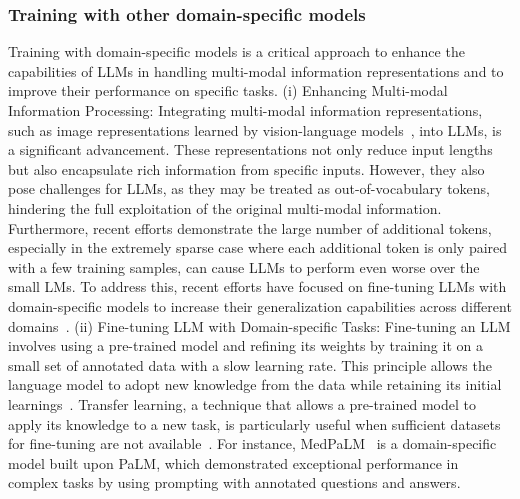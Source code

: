 \documentclass[lettersize,journal]{IEEEtran}
\begin{document}
\subsubsection{Training with other domain-specific models}
Training with domain-specific models is a critical approach to enhance the capabilities of LLMs in handling multi-modal information representations and to improve their performance on specific tasks.
(i) Enhancing Multi-modal Information Processing: 
Integrating multi-modal information representations, such as image representations learned by vision-language models~\cite{geng2022improving}, into LLMs, is a significant advancement. These representations not only reduce input lengths but also encapsulate rich information from specific inputs. 
However, they also pose challenges for LLMs, as they may be treated as out-of-vocabulary tokens, hindering the full exploitation of the original multi-modal information. Furthermore, recent efforts demonstrate the large number of additional tokens, especially in the extremely sparse case where each additional token is only paired with a few training samples, can cause LLMs to perform even worse over the small LMs. 
To address this, recent efforts have focused on fine-tuning LLMs with domain-specific models to increase their generalization capabilities across different domains~\cite{tariq2024domain}.
(ii) Fine-tuning LLM with Domain-specific Tasks:
Fine-tuning an LLM involves using a pre-trained model and refining its weights by training it on a small set of annotated data with a slow learning rate. This principle allows the language model to adopt new knowledge from the data while retaining its initial learnings~\cite{shen2024tag}. Transfer learning, a technique that allows a pre-trained model to apply its knowledge to a new task, is particularly useful when sufficient datasets for fine-tuning are not available~\cite{jeong2024fine}. For instance, MedPaLM~\cite{singhal2023large} is a domain-specific model built upon PaLM, which demonstrated exceptional performance in complex tasks by using prompting with annotated questions and answers.
\end{document}
